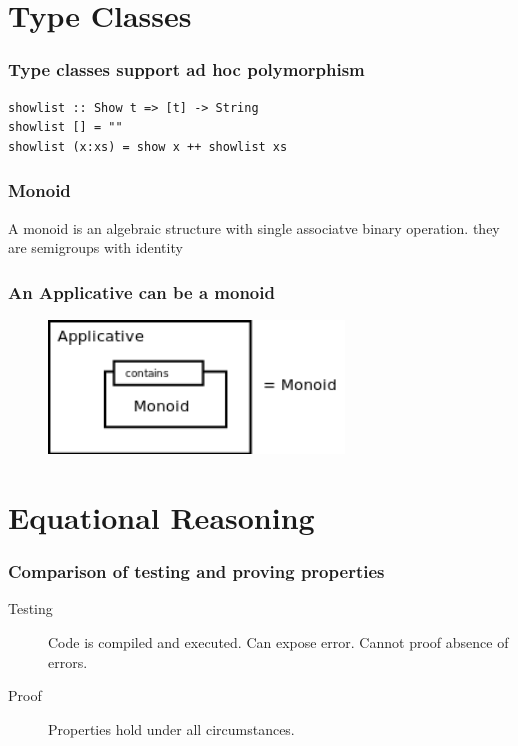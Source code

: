 \documentclass{beamer}
\begin{document}
\section{Type Classes}

\lstset{
basicstyle=\ttfamily,
columns=fullflexible,
keepspaces=true,
captionpos=b
}

\begin{frame}[fragile]
  \frametitle{Type classes support ad hoc polymorphism}

\begin{lstlisting}
showlist :: Show t => [t] -> String
showlist [] = ""
showlist (x:xs) = show x ++ showlist xs
\end{lstlisting}

\end{frame}


\begin{frame}[fragile]
  \frametitle{Monoid}
A monoid is an algebraic structure with single associatve binary operation. they are semigroups with identity
\end{frame}

\begin{frame}[fragile]
  \frametitle{An Applicative can be a monoid}
\begin{figure}
  \centering
     \includegraphics[width=0.7\textwidth]{monoid}
\end{figure}
\end{frame}

\section{Equational Reasoning}

\begin{frame}
  \frametitle{Comparison of testing and proving properties}
  \begin{description}
  \item[Testing] Code is compiled and executed. Can expose error. Cannot proof absence of errors. 
  \item[Proof] Properties hold under all circumstances.
  \end{description}
\end{frame}
\end{document}
